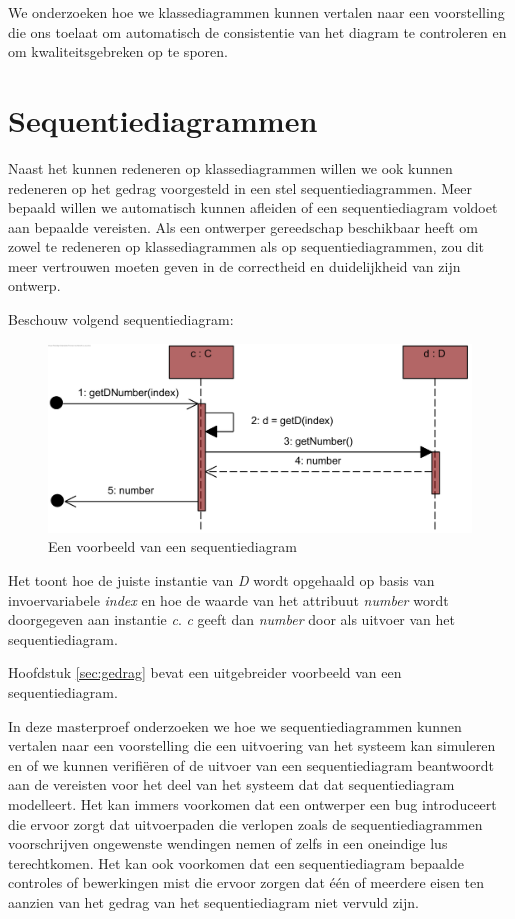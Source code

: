 We onderzoeken hoe we klassediagrammen kunnen vertalen naar een voorstelling die ons toelaat om automatisch de consistentie van het diagram te controleren en om kwaliteitsgebreken op te sporen.

\section{Sequentiediagrammen}

Naast het kunnen redeneren op klassediagrammen willen we ook kunnen redeneren op het gedrag voorgesteld in een stel sequentiediagrammen. Meer bepaald willen we automatisch kunnen afleiden of een sequentiediagram voldoet aan bepaalde vereisten. Als een ontwerper gereedschap beschikbaar heeft om zowel te redeneren op klassediagrammen als op sequentiediagrammen, zou dit meer vertrouwen moeten geven in de correctheid en duidelijkheid van zijn ontwerp.

Beschouw volgend sequentiediagram:

\begin{figure}[H]
	\label{fig:sd}
	\centering
	\includegraphics{intro/sd.png}
	\caption{Een voorbeeld van een sequentiediagram}
\end{figure}

Het toont hoe de juiste instantie van \textit{D} wordt opgehaald op basis van invoervariabele \textit{index} en hoe de waarde van het attribuut \textit{number} wordt doorgegeven aan instantie \textit{c}. \textit{c} geeft dan \textit{number} door als uitvoer van het sequentiediagram.

Hoofdstuk \ref{sec:gedrag} bevat een uitgebreider voorbeeld van een sequentiediagram.

In deze masterproef onderzoeken we hoe we sequentiediagrammen kunnen vertalen naar een voorstelling die een uitvoering van het systeem kan simuleren en of we kunnen verifi\"eren of de uitvoer van een sequentiediagram beantwoordt aan de vereisten voor het deel van het systeem dat dat sequentiediagram modelleert. Het kan immers voorkomen dat een ontwerper een bug introduceert die ervoor zorgt dat uitvoerpaden die verlopen zoals de sequentiediagrammen voorschrijven ongewenste wendingen nemen of zelfs in een oneindige lus terechtkomen. Het kan ook voorkomen dat een sequentiediagram bepaalde controles of bewerkingen mist die ervoor zorgen dat \'e\'en of meerdere eisen ten aanzien van het gedrag van het sequentiediagram niet vervuld zijn.


